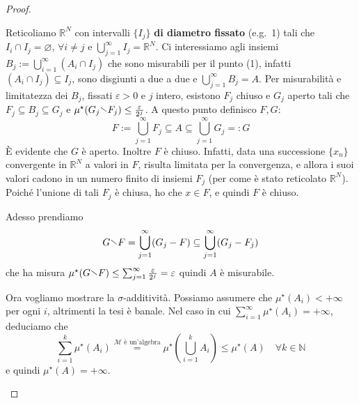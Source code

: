 \begin{proof}
\begin{enumerate}[label = \arabic*.]
        Reticoliamo \(\mathbb{R}^{N}\) con intervalli \(\{I_{j}\} \) \textbf{di
        diametro fissato} (e.g.~1) tali che \(I_{i} \cap  I_{j} = \varnothing\),
        \(\forall i \neq j\) e
        \(\bigcup_{j=1}^{\infty} I_{j} = \mathbb{R}^{N} \). Ci interessiamo agli
        insiemi \(B_{j} := \bigcup_{i=1}^{\infty} (A_{i} \cap I_{j}) \) che sono misurabili per il punto (1), infatti \((A_{i} \cap I_{j})
        \subseteq I_{j} \), sono disgiunti a due a due e
        \(\bigcup_{j = 1}^{\infty} B_{j} = A \). Per misurabilità e limitatezza dei \(B_j\), fissati \(\varepsilon > 0\)
     e \( j\) intero, esistono \(F_{j}\) chiuso e \(G_{j}\) aperto
        tali che \(F_{j} \subseteq B_{j} \subseteq G_{j}  \) e \(\mu^\star(G_{j}
        \sminus F_{j}) \le \frac{\varepsilon}{2^{j}}\). A questo punto definisco \(F, G\):
        \[
            F := \bigcup_{j=1}^{\infty} F_{j} \subseteq A \subseteq
            \bigcup_{j=1}^{\infty} G_{j} =: G
        \]
        È evidente che \(G\) è aperto. Inoltre \(F\) è chiuso. Infatti, data una
        successione \(\{x_{n}\} \) convergente in \(\mathbb{R}^{N}\) a valori
        in \(F\), risulta limitata per la convergenza, e allora i suoi valori cadono
        in un numero finito di insiemi \(F_{j}\) (per come è stato reticolato \(\mathbb{R}^N\)). Poiché l'unione di tali
        \(F_{j}\) è chiusa, ho che \(x \in F\), e quindi \(F\) è chiuso.

        Adesso prendiamo \[G \sminus F = \bigcup_{j=1}^{\infty}(G_{j} - F)
        \subseteq \bigcup_{j = 1}^{\infty} (G_{j} - F_{j}) \] che ha misura
        \(\mu^\star(G\sminus F) \le \sum_{j=1}^{\infty}
        \frac{\varepsilon}{2^{j}} = \varepsilon \) quindi \(A\) è misurabile.

        Ora vogliamo mostrare la \(\sigma\)-additività. Possiamo assumere che
        \(\mu^\star(A_{i}) < +\infty\) per ogni \(i\), altrimenti la tesi è
        banale. Nel caso in cui \(\sum_{i=1}^{\infty} \mu^\star(A_{i}) =
        +\infty \), deduciamo che 
        \[
            \sum_{i=1}^{k} \mu^\star(A_{i}) \overset{\mathcal{M} \text{ è
            un'algebra}}{=} \mu^\star \left( \bigcup_{i=1}^{k}A_{i} \right) \le \mu^\star(A) \quad \forall k \in
            \mathbb{N}
        \]
        e quindi \(\mu^\star(A) = +\infty\).


\end{enumerate}
\end{proof}
